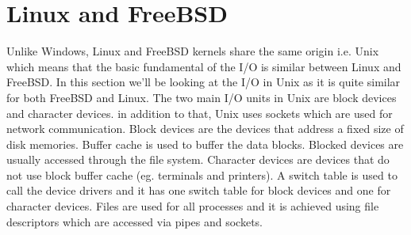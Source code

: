 \documentclass[letterpaper,10pt,titlepage]{IEEEtran}
\begin{document}
\section*{Linux and FreeBSD}
Unlike Windows, Linux and FreeBSD kernels share the same origin i.e. Unix which means that the basic fundamental of the I/O is similar between Linux and FreeBSD. In this section we'll be looking at the I/O in Unix as it is quite similar for both FreeBSD and Linux. The two main I/O units in Unix are block devices and character devices. in addition to that, Unix uses sockets which are used for network communication. Block devices are the devices that address a fixed size of disk memories. Buffer cache is used to buffer the data blocks. Blocked devices are usually accessed through the file system. Character devices are devices that do not use block buffer cache (eg. terminals and printers). A switch table is used to call the device drivers and it has one switch table for block devices and one for character devices. Files are used for all processes and it is achieved using file descriptors which are accessed via pipes and sockets. 




\nocite{*}%


\end{document}
